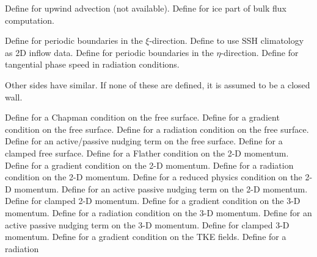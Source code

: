 \begin{klist}
\begin{klist}
\begin{klist}
	 Define for upwind advection (not available).
	 Define for ice part of bulk flux
	computation.
      \end{klist}
  \end{klist}
   \mbox{}
  \begin{klist}
       Define for periodic boundaries in the
   $\xi$-direction.
           Define to use SSH climatology as 2D inflow
   data.
       Define for periodic boundaries in the
   $\eta$-direction.
       Define for tangential phase speed in
     radiation conditions.
  \end{klist}
   Other sides have
similar. If none of these are defined, it is assumed to be a closed wall.
  \begin{klist}
       Define for a Chapman
   condition on the free surface.
       Define for a gradient
   condition on the free surface.
       Define for a radiation
   condition on the free surface.
       Define for an active/passive nudging term
   on the free surface.
       Define for a clamped free surface.
       Define for a Flather
   condition on the 2-D momentum.
       Define for a gradient
   condition on the 2-D momentum.
       Define for a radiation
   condition on the 2-D momentum.
       Define for a reduced physics
   condition on the 2-D momentum.
       Define for an active passive nudging term
   on the 2-D momentum.
       Define for clamped 2-D momentum.
       Define for a gradient
   condition on the 3-D momentum.
       Define for a radiation
   condition on the 3-D momentum.
       Define for an active passive nudging term
   on the 3-D momentum.
       Define for clamped 3-D momentum.
       Define for a gradient
   condition on the TKE fields.
       Define for a radiation

\end{klist}
\end{klist}
